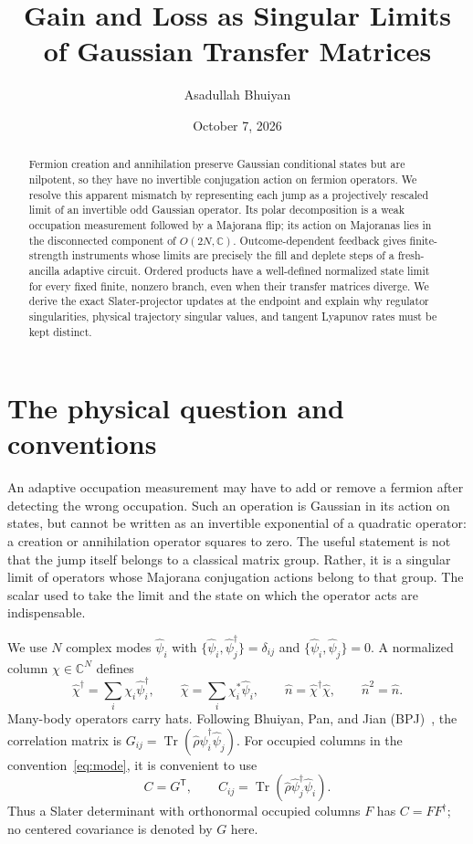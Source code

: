 \documentclass[aps,prb,onecolumn,nofootinbib,superscriptaddress]{revtex4-2}
\newcommand{\Tr}{\operatorname{Tr}}
\begin{document}
\title{Gain and Loss as Singular Limits of Gaussian Transfer Matrices}
\author{Asadullah Bhuiyan}
\noaffiliation
\date{October 7, 2026}
\begin{abstract}
Fermion creation and annihilation preserve Gaussian conditional states but
are nilpotent, so they have no invertible conjugation action on fermion
operators. We resolve this apparent mismatch by representing each jump as
a projectively rescaled limit of an invertible odd Gaussian operator. Its
polar decomposition is a weak occupation measurement followed by a
Majorana flip; its action on Majoranas lies in the disconnected component
of $O(2N,\mathbb C)$. Outcome-dependent feedback gives finite-strength
instruments whose limits are precisely the fill and deplete steps of a
fresh-ancilla adaptive circuit. Ordered products have a well-defined
normalized state limit for every fixed finite, nonzero branch, even when
their transfer matrices diverge. We derive the exact Slater-projector
updates at the endpoint and explain why regulator singularities, physical
trajectory singular values, and tangent Lyapunov rates must be kept distinct.
\end{abstract}
\maketitle
\setcounter{tocdepth}{2}
\tableofcontents

\section{The physical question and conventions}
An adaptive occupation measurement may have to add or remove a fermion
after detecting the wrong occupation. Such an operation is Gaussian in
its action on states, but cannot be written as an invertible exponential
of a quadratic operator: a creation or annihilation operator squares to
zero. The useful statement is not that the jump itself belongs to a
classical matrix group. Rather, it is a singular limit of operators whose
Majorana conjugation actions belong to that group. The scalar used to
take the limit and the state on which the operator acts are indispensable.

We use $N$ complex modes $\hat\psi_i$ with
$\{\hat\psi_i,\hat\psi_j^\dagger\}=\delta_{ij}$ and
$\{\hat\psi_i,\hat\psi_j\}=0$. A normalized column $\chi\in\mathbb C^N$
defines
\begin{equation}
 \hat\chi^\dagger=\sum_i\chi_i\hat\psi_i^\dagger,\qquad
 \hat\chi=\sum_i\chi_i^*\hat\psi_i,\qquad
 \hat n=\hat\chi^\dagger\hat\chi,\qquad \hat n^2=\hat n.
 \label{eq:mode}
\end{equation}
Many-body operators carry hats. Following Bhuiyan, Pan, and Jian
(BPJ)~\cite{BhuiyanPanJian2026}, the correlation matrix is
$G_{ij}=\Tr(\hat\rho\hat\psi_i^\dagger\hat\psi_j)$. For occupied columns
in the convention~\eqref{eq:mode}, it is convenient to use
\begin{equation}
 C=G^{\mathsf T},\qquad C_{ij}=\Tr(\hat\rho\hat\psi_j^\dagger\hat\psi_i).
 \label{eq:C-convention}
\end{equation}
Thus a Slater determinant with orthonormal occupied columns $F$ has
$C=FF^\dagger$; no centered covariance is denoted by $G$ here.
\end{document}
